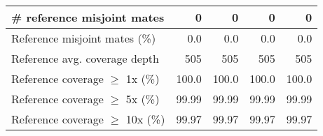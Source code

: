 \documentclass[12pt,a4paper]{article}
\begin{document}
\begin{table}[ht]
\begin{center}
\begin{tabular}{|l*{4}{|r}|}
\# reference misjoint mates & 0 & 0 & 0 & 0 \\ \hline
Reference misjoint mates (\%) & 0.0 & 0.0 & 0.0 & 0.0 \\ \hline
Reference avg. coverage depth & 505 & 505 & 505 & 505 \\ \hline
Reference coverage $\geq$ 1x (\%) & 100.0 & 100.0 & 100.0 & 100.0 \\ \hline
Reference coverage $\geq$ 5x (\%) & 99.99 & 99.99 & 99.99 & 99.99 \\ \hline
Reference coverage $\geq$ 10x (\%) & 99.97 & 99.97 & 99.97 & 99.97 \\ \hline
\end{tabular}
\end{center}
\end{table}
\end{document}
